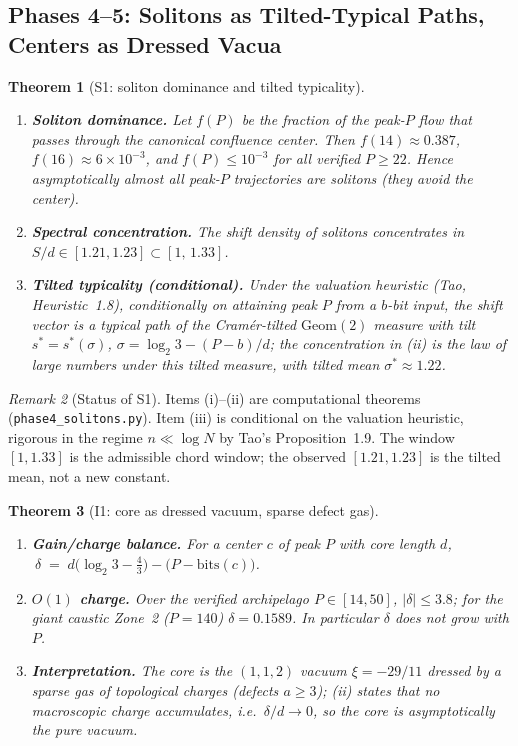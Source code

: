 \documentclass[12pt,a4paper]{article}
\newtheorem{theorem}{Theorem}[section]
\theoremstyle{remark}
\newtheorem{remark}[theorem]{Remark}
\begin{document}
\subsection{Phases 4--5: Solitons as Tilted-Typical Paths, Centers as Dressed Vacua}
\begin{theorem}[S1: soliton dominance and tilted typicality]
\label{thm:S1}
\begin{enumerate}
\item[(i)] \textbf{Soliton dominance.} Let $f(P)$ be the fraction of the peak-$P$
flow that passes through the canonical confluence center. Then
$f(14)\approx0.387$, $f(16)\approx6\times10^{-3}$, and $f(P)\le10^{-3}$ for all
verified $P\ge22$. Hence asymptotically almost all peak-$P$ trajectories are
solitons (they avoid the center).
\item[(ii)] \textbf{Spectral concentration.} The shift density of solitons concentrates
in $S/d\in[1.21,1.23]\subset[1,\,1.33]$.
\item[(iii)] \textbf{Tilted typicality (conditional).} Under the valuation heuristic
(Tao, Heuristic~1.8), conditionally on attaining peak $P$ from a $b$-bit input, the
shift vector is a typical path of the Cram\'er-tilted $\mathrm{Geom}(2)$ measure with
tilt $s^*=s^*(\sigma)$, $\sigma=\log_2 3-(P-b)/d$; the concentration in (ii) is the
law of large numbers under this tilted measure, with tilted mean $\sigma^*\approx1.22$.
\end{enumerate}
\end{theorem}
\begin{remark}[Status of S1]
Items (i)--(ii) are computational theorems (\texttt{phase4\_solitons.py}). Item (iii)
is conditional on the valuation heuristic, rigorous in the regime $n\ll\log N$ by
Tao's Proposition~1.9. The window $[1,1.33]$ is the admissible chord window; the
observed $[1.21,1.23]$ is the tilted mean, not a new constant.
\end{remark}
\begin{theorem}[I1: core as dressed vacuum, sparse defect gas]
\label{thm:I1}
\begin{enumerate}
\item[(i)] \textbf{Gain/charge balance.} For a center $c$ of peak $P$ with core length
$d$, $\ \delta \;=\; d\big(\log_2 3-\tfrac43\big)-\big(P-\mathrm{bits}(c)\big)$.
\item[(ii)] \textbf{$O(1)$ charge.} Over the verified archipelago $P\in[14,50]$,
$|\delta|\le3.8$; for the giant caustic Zone~2 ($P=140$) $\delta=0.1589$.
In particular $\delta$ does not grow with $P$.
\item[(iii)] \textbf{Interpretation.} The core is the $(1,1,2)$ vacuum
$\xi=-29/11$ dressed by a sparse gas of topological charges (defects $a\ge3$);
(ii) states that no macroscopic charge accumulates, i.e.\ $\delta/d\to0$, so the
core is asymptotically the pure vacuum.
\end{enumerate}
\end{theorem}
\end{document}
